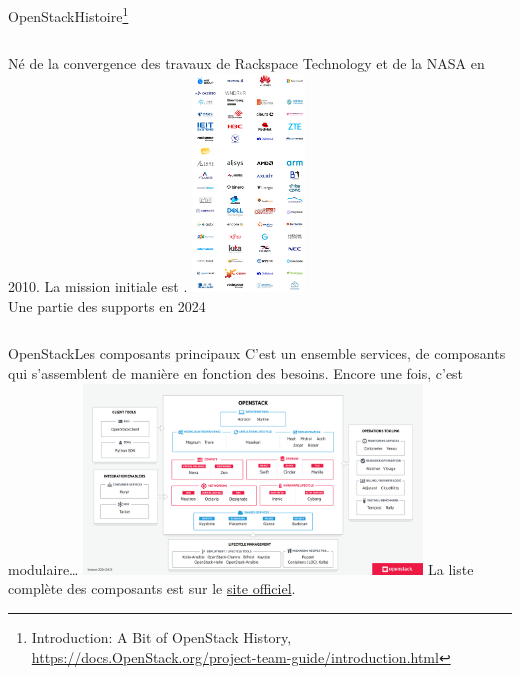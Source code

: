 \documentclass{beamer}
\begin{document}
    \begin{frame}{OpenStack}{Histoire\footnote{Introduction: A Bit of OpenStack History, \url{https://docs.OpenStack.org/project-team-guide/introduction.html}}}

        \begin{columns}
            Né de la convergence des travaux de Rackspace Technology et de la NASA en 2010.
            \bigbreak
            La mission initiale est .
            \centering
            \includegraphics[width=3cm]{image/openstack-supports} \\ \tiny{Une partie des supports en 2024}\\
        \end{columns}
    \end{frame}

    \begin{frame}{OpenStack}{Les composants principaux}
        C'est un ensemble services, de composants qui s'assemblent de manière  en fonction des besoins.
        Encore une fois, c'est modulaire\ldots
        \bigbreak
        \centering
        \includegraphics[width=9cm]{image/openstack-components}
        \bigbreak
        \flushleft
        La liste complète des composants est sur le \href{https://www.OpenStack.org/software/project-navigator/OpenStack-components\#OpenStack-services}{site officiel}.
    \end{frame}
\end{document}

